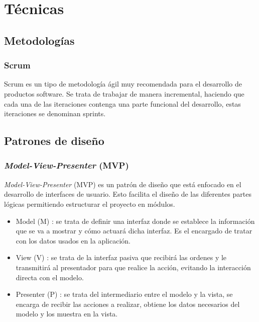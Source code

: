 
\section{Técnicas}

\subsection{Metodologías}

\subsubsection{Scrum}
Scrum \cite{WhatisSc12:online}  es un tipo de metodología ágil muy recomendada para el desarrollo de productos software. Se trata de trabajar de manera incremental, haciendo que cada una de las iteraciones contenga una parte funcional del desarrollo, estas iteraciones se denominan sprints.

\subsection{Patrones de diseño}
\subsubsection{\textit{Model-View-Presenter} (MVP)}
\textit{Model-View-Presenter} (MVP) \cite{mvp:online} es un patrón de diseño que está enfocado en el desarrollo de interfaces de usuario. Esto facilita el diseño de las diferentes partes lógicas permitiendo estructurar el proyecto en módulos.
\begin{itemize}
    \item Model (M) \cite{mvp:online}: se trata de definir una interfaz donde se establece la información que se va a mostrar y cómo actuará dicha interfaz. Es el encargado de tratar con los datos usados en la aplicación.
    \item View (V) \cite{mvp:online}: se trata de la interfaz pasiva que recibirá las ordenes y le transmitirá al presentador para que realice la acción, evitando la interacción directa con el modelo.
    \item Presenter (P) \cite{mvp:online}: se trata del intermediario entre el modelo y la vista, se encarga de recibir las acciones a realizar, obtiene los datos necesarios del modelo y los muestra en la vista.
\end{itemize}


